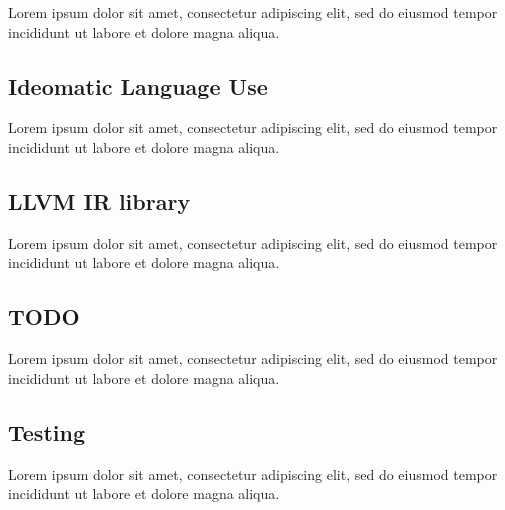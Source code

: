 \documentclass[12pt, a4paper]{article}
\begin{document}

Lorem ipsum dolor sit amet, consectetur adipiscing elit, sed do eiusmod tempor incididunt ut labore et dolore magna aliqua.


\subsection{Ideomatic Language Use}

Lorem ipsum dolor sit amet, consectetur adipiscing elit, sed do eiusmod tempor incididunt ut labore et dolore magna aliqua.


\subsection{LLVM IR library}

Lorem ipsum dolor sit amet, consectetur adipiscing elit, sed do eiusmod tempor incididunt ut labore et dolore magna aliqua.


\subsection{TODO}

Lorem ipsum dolor sit amet, consectetur adipiscing elit, sed do eiusmod tempor incididunt ut labore et dolore magna aliqua.


\subsection{Testing}

Lorem ipsum dolor sit amet, consectetur adipiscing elit, sed do eiusmod tempor incididunt ut labore et dolore magna aliqua.

\pagebreak

\end{document}
